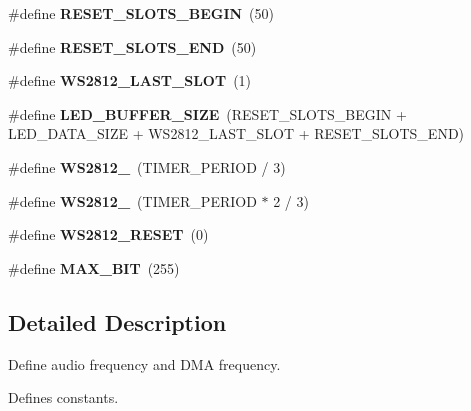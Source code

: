 \begin{DoxyCompactItemize}
\#define {\bfseries R\+E\+S\+E\+T\+\_\+\+S\+L\+O\+T\+S\+\_\+\+B\+E\+G\+IN}~(50)
\item 
\mbox{\label{group___constant_ga91e46b7f75ff75a4719a9d7f589df5a3}} 
\#define {\bfseries R\+E\+S\+E\+T\+\_\+\+S\+L\+O\+T\+S\+\_\+\+E\+ND}~(50)
\item 
\mbox{\label{group___constant_gacbccf04b27120fd8ba0a8eae7866291f}} 
\#define {\bfseries W\+S2812\+\_\+\+L\+A\+S\+T\+\_\+\+S\+L\+OT}~(1)
\item 
\mbox{\label{group___constant_ga398165d967d8a2c8ff57ddd0a081a5ff}} 
\#define {\bfseries L\+E\+D\+\_\+\+B\+U\+F\+F\+E\+R\+\_\+\+S\+I\+ZE}~(R\+E\+S\+E\+T\+\_\+\+S\+L\+O\+T\+S\+\_\+\+B\+E\+G\+IN + L\+E\+D\+\_\+\+D\+A\+T\+A\+\_\+\+S\+I\+ZE + W\+S2812\+\_\+\+L\+A\+S\+T\+\_\+\+S\+L\+OT + R\+E\+S\+E\+T\+\_\+\+S\+L\+O\+T\+S\+\_\+\+E\+ND)
\item 
\mbox{\label{group___constant_ga3c67cd1a76ba7e85676da5f023f42430}} 
\#define {\bfseries W\+S2812\+\_}~(T\+I\+M\+E\+R\+\_\+\+P\+E\+R\+I\+OD / 3)
\item 
\mbox{\label{group___constant_gad4cec7bff3f072ffe9ec1e11324c7418}} 
\#define {\bfseries W\+S2812\+\_}~(T\+I\+M\+E\+R\+\_\+\+P\+E\+R\+I\+OD $\ast$ 2 / 3)
\item 
\mbox{\label{group___constant_gaef8a90792d52a7085de6c0affec15557}} 
\#define {\bfseries W\+S2812\+\_\+\+R\+E\+S\+ET}~(0)
\item 
\mbox{\label{group___constant_gaaf645a2813f2274619a70855afb92aca}} 
\#define {\bfseries M\+A\+X\+\_\+B\+IT}~(255)
\end{DoxyCompactItemize}


\subsection{Detailed Description}
Define audio frequency and D\+MA frequency. 

Defines constants.